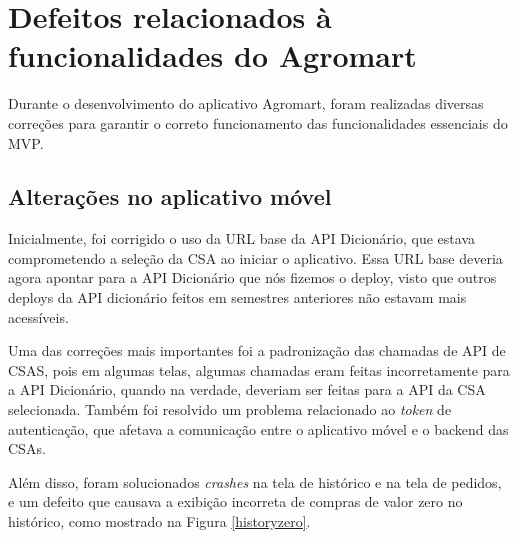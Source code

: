 \section{Defeitos relacionados à funcionalidades do Agromart}
Durante o desenvolvimento do aplicativo Agromart, foram realizadas diversas correções para garantir o correto funcionamento das funcionalidades essenciais do MVP.

\subsection{Alterações no aplicativo móvel}

Inicialmente, foi corrigido o uso da URL base da API Dicionário, que estava comprometendo a seleção da CSA ao iniciar o aplicativo. Essa URL base deveria agora apontar para a API Dicionário que nós fizemos o deploy, visto que outros deploys da API dicionário feitos em semestres anteriores não estavam mais acessíveis.

Uma das correções mais importantes foi a padronização das chamadas de API de CSAS, pois em algumas telas, algumas chamadas eram feitas incorretamente para a API Dicionário, quando na verdade, deveriam ser feitas para a API da CSA selecionada. Também foi resolvido um problema relacionado ao \textit{token} de autenticação, que afetava a comunicação entre o aplicativo móvel e o backend das CSAs.

Além disso, foram solucionados \textit{crashes} na tela de histórico e na tela de pedidos, e um defeito que causava a exibição incorreta de compras de valor zero no histórico, como mostrado na Figura \ref{historyzero}.

